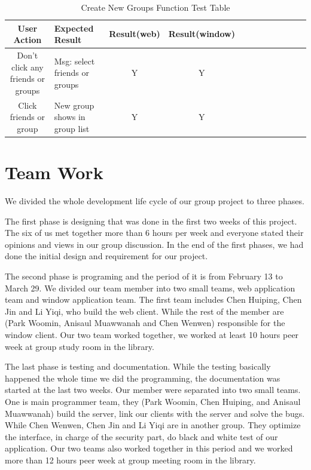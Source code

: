 \documentclass[a4paper,11pt]{article}
\begin{document}
\begin{table}[h!]
\centering
\small
  \caption{Create New Groups Function Test Table}
\begin{tabular}{|c|l|c|c|c|c|c|c|c|c|c|c|}
 \hline
  \label{tab:table1}
      User Action & Expected Result & Result(web) & Result(window)\\ 
    \hline
   Don’t click any friends or groups  & Msg: select friends or groups & Y & Y\\ \hline
 
   Click friends or group & New group shows in group list & Y & Y\\ \hline
    
  \end{tabular}
\end{table}




\section{Team Work}
We divided the whole development life cycle of our group project to three phases. 

The first phase is designing that was done in the first two weeks of this project. The six of us met together more than 6 hours per week and everyone stated their opinions and views in our group discussion. In the end of the first phases, we had done the initial design and requirement for our project.

The second phase is programing and the period of it is from February 13 to March 29. We divided our team member into two small teams, web application team and window application team. The first team includes Chen Huiping, Chen Jin and Li Yiqi, who build the web client. While the rest of the member are (Park Woomin, Anisaul Muawwanah and Chen Wenwen) responsible for the window client. Our two team worked together, we worked at least 10 hours peer week at group study room in the library.

The last phase is testing and documentation. While the testing basically happened the whole time we did the programming, the documentation was started at the last two weeks. Our member were separated into two small teams. One is main programmer team, they (Park Woomin, Chen Huiping, and Anisaul Muawwanah) build the server, link our clients with the server and solve the bugs. While Chen Wenwen, Chen Jin and Li Yiqi are in another group. They optimize the interface, in charge of the security part, do black and white test of our application. Our two teams also worked together in this period and we worked more than 12 hours peer week at group meeting room in the library.
\end{document}
